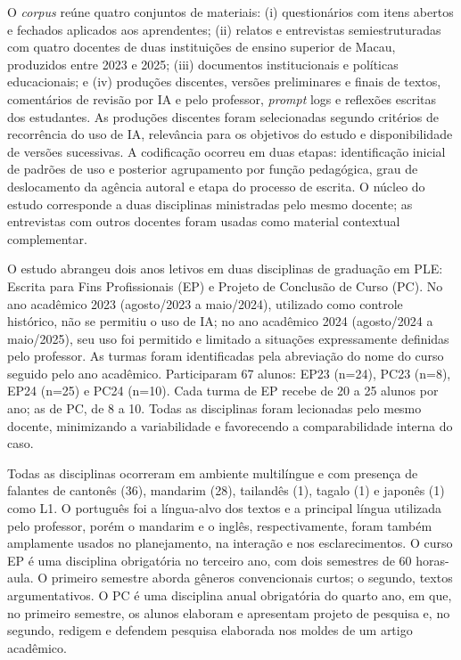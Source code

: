 \documentclass[portuguese]{textolivre}
\begin{document}
O \textit{corpus} reúne quatro conjuntos de materiais: (i) questionários com itens abertos e fechados aplicados aos aprendentes; (ii) relatos e entrevistas semiestruturadas com quatro docentes de duas instituições de ensino superior de Macau, produzidos entre 2023 e 2025; (iii) documentos institucionais e políticas educacionais; e (iv) produções discentes, versões preliminares e finais de textos, comentários de revisão por IA e pelo professor, \textit{prompt} logs e reflexões escritas dos estudantes. As produções discentes foram selecionadas segundo critérios de recorrência do uso de IA, relevância para os objetivos do estudo e disponibilidade de versões sucessivas. A codificação ocorreu em duas etapas: identificação inicial de padrões de uso e posterior agrupamento por função pedagógica, grau de deslocamento da agência autoral e etapa do processo de escrita. O núcleo do estudo corresponde a duas disciplinas ministradas pelo mesmo docente; as entrevistas com outros docentes foram usadas como material contextual complementar.

O estudo abrangeu dois anos letivos em duas disciplinas de graduação em PLE: Escrita para Fins Profissionais (EP) e Projeto de Conclusão de Curso (PC). No ano acadêmico 2023 (agosto/2023 a maio/2024), utilizado como controle histórico, não se permitiu o uso de IA; no ano acadêmico 2024 (agosto/2024 a maio/2025), seu uso foi permitido e limitado a situações expressamente definidas pelo professor. As turmas foram identificadas pela abreviação do nome do curso seguido pelo ano acadêmico. Participaram 67 alunos: EP23 (n=24), PC23 (n=8), EP24 (n=25) e PC24 (n=10). Cada turma de EP recebe de 20 a 25 alunos por ano; as de PC, de 8 a 10. Todas as disciplinas foram lecionadas pelo mesmo docente, minimizando a variabilidade e favorecendo a comparabilidade interna do caso. 

Todas as disciplinas ocorreram em ambiente multilíngue e com presença de falantes de cantonês (36), mandarim (28), tailandês (1), tagalo (1) e japonês (1) como L1. O português foi a língua-alvo dos textos e a principal língua utilizada pelo professor, porém o mandarim e o inglês, respectivamente, foram também amplamente usados no planejamento, na interação e nos esclarecimentos. O curso EP é uma disciplina obrigatória no terceiro ano, com dois semestres de 60 horas-aula. O primeiro semestre aborda gêneros convencionais curtos; o segundo, textos argumentativos. O PC é uma disciplina anual obrigatória do quarto ano, em que, no primeiro semestre, os alunos elaboram e apresentam projeto de pesquisa e, no segundo, redigem e defendem pesquisa elaborada nos moldes de um artigo acadêmico.
\end{document}
